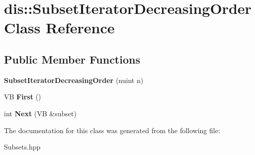\hypertarget{classdis_1_1_subset_iterator_decreasing_order}{\section{dis\-:\-:Subset\-Iterator\-Decreasing\-Order Class Reference}
\label{classdis_1_1_subset_iterator_decreasing_order}
}
\subsection*{Public Member Functions}
\begin{DoxyCompactItemize}
\item 
\hypertarget{classdis_1_1_subset_iterator_decreasing_order_a4ca74c5d26c20a07b50894aa13203631}{{\bfseries Subset\-Iterator\-Decreasing\-Order} (nuint n)}\label{classdis_1_1_subset_iterator_decreasing_order_a4ca74c5d26c20a07b50894aa13203631}

\item 
\hypertarget{classdis_1_1_subset_iterator_decreasing_order_ae8ab142cb0972de726068c9351d1dff2}{V\-B {\bfseries First} ()}\label{classdis_1_1_subset_iterator_decreasing_order_ae8ab142cb0972de726068c9351d1dff2}

\item 
\hypertarget{classdis_1_1_subset_iterator_decreasing_order_a8471c4a46961583d5a4eb1cbc8186f2c}{int {\bfseries Next} (V\-B \&subset)}\label{classdis_1_1_subset_iterator_decreasing_order_a8471c4a46961583d5a4eb1cbc8186f2c}

\end{DoxyCompactItemize}


The documentation for this class was generated from the following file\-:\begin{DoxyCompactItemize}
\item 
Subsets.\-hpp\end{DoxyCompactItemize}
